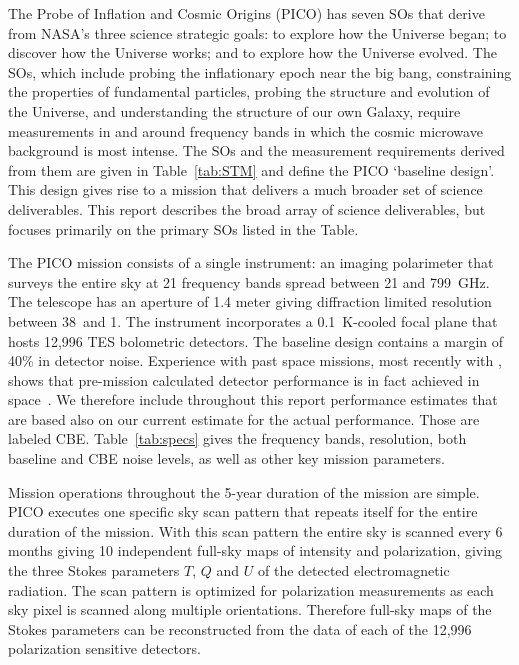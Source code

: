 \documentclass[PICOReport.tex]{subfiles}
\begin{document}
 
 
The Probe of Inflation and Cosmic Origins (PICO) has seven \ac{SOs} that derive from NASA's three science strategic goals: to explore how the Universe began; to discover how the Universe works; and to explore how the Universe evolved. The \ac{SOs}, which include probing the inflationary epoch near the big bang, constraining the properties of fundamental particles, probing the structure and evolution of the Universe, and understanding the structure of our own Galaxy, require measurements in and around frequency bands in which the cosmic microwave background is most intense. The \ac{SOs} and the measurement requirements derived from them are given in Table~\ref{tab:STM} and define the PICO `baseline design'. This design gives rise to a mission that delivers a much broader set of science deliverables.  This report describes the broad array of science deliverables, but focuses primarily on the primary \ac{SOs} listed in the Table. 

The PICO mission consists of a single instrument: an imaging polarimeter that surveys the entire sky at 21 frequency bands spread between 21 and 799~GHz.  The telescope has an aperture of 1.4 meter giving diffraction limited resolution between 38\arcmin\ and 1\arcmin . The instrument incorporates a 0.1~K-cooled focal plane that hosts 12,996 \ac{TES} bolometric detectors. The baseline design contains a margin of 40\% in detector noise. Experience with past space missions, most recently with \planck , shows that pre-mission calculated detector performance is in fact achieved in space~\cite{planck1101.2038,planck1101.2039}. We therefore include throughout this report performance estimates that are based also on our current estimate for the actual performance. Those are labeled \ac{CBE}. Table~\ref{tab:specs} gives the frequency bands, resolution, both baseline and \ac{CBE} noise levels, as well as other key mission parameters. 

Mission operations throughout the 5-year duration of the mission are simple. PICO executes one specific sky scan pattern that repeats itself for the entire duration of the mission. With this scan pattern the entire sky is scanned every 6 months giving 10 independent full-sky maps of intensity and polarization, giving the three Stokes parameters $T$, $Q$ and $U$ of the detected electromagnetic radiation.  The scan pattern is optimized for polarization measurements as each sky pixel is scanned along multiple orientations. Therefore full-sky maps of the Stokes parameters can be reconstructed from the data of each of the 12,996 polarization sensitive detectors.
\end{document}
